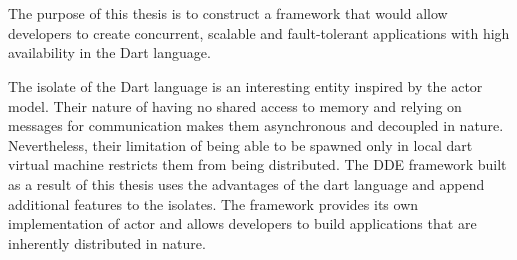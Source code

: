 \chapter{\abstractname}


  The purpose of this thesis is to construct a framework that would allow developers to create concurrent, scalable and fault-tolerant applications with high availability in the Dart language.

  The isolate of the Dart language is an interesting entity inspired by the actor model. Their nature of having no shared access to memory and relying on messages for communication makes them asynchronous and decoupled in nature. Nevertheless, their limitation of being able to be spawned only in local dart virtual machine restricts them from being distributed. The DDE framework built as a result of this thesis uses the advantages of the dart language and append additional features to the isolates. The framework provides its own implementation of actor and allows developers to build applications that are inherently distributed in nature.
